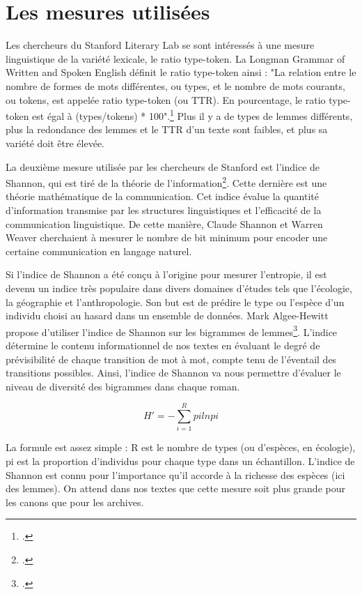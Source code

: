 \documentclass[a4paper,twoside,12pt]{book}
\begin{document}
\section{Les mesures utilisées}
 Les chercheurs du Stanford Literary Lab se sont intéressés à une mesure linguistique de la variété lexicale, le ratio type-token. La Longman Grammar of Written and Spoken English définit le ratio type-token ainsi : "La relation entre le nombre de formes de mots différentes, ou types, et le nombre de mots courants, ou tokens, est appelée ratio type-token (ou TTR). En pourcentage, le ratio type-token est égal à (types/tokens) * 100".\footcites{biber_longman_2011} Plus il y a de types de lemmes différents, plus la redondance des lemmes et le TTR d'un texte sont faibles, et plus sa variété doit être élevée.

La deuxième mesure utilisée par les chercheurs de Stanford est l'indice de Shannon, qui est tiré de la théorie de l'information\footcites{shannon_mathematical_1948}. Cette dernière est une théorie mathématique de la communication. Cet indice évalue la quantité d'information transmise par les structures linguistiques et l'efficacité de la communication linguistique. De cette manière, Claude Shannon et Warren Weaver cherchaient à mesurer le nombre de bit minimum pour encoder une certaine communication en langage naturel. 

Si l'indice de Shannon a été conçu à l'origine pour mesurer l'entropie, il est devenu un indice très populaire dans divers domaines d'études tels que l'écologie, la géographie et l'anthropologie. Son but est de prédire le type ou l'espèce d'un individu choisi au hasard dans un ensemble de données. Mark Algee-Hewitt propose d'utiliser l'indice de Shannon sur les bigrammes de lemmes\footcites{algee-hewitt_discourse_nodate}. L'indice détermine le contenu informationnel de nos textes en évaluant le degré de prévisibilité de chaque transition de mot à mot, compte tenu de l'éventail des transitions possibles. Ainsi, l'indice de Shannon va nous permettre d'évaluer le niveau de diversité des bigrammes dans chaque roman.

\begin{equation}
H\ensuremath{\prime}=-\sum_{i=1}^R pi ln pi
\end{equation}

La formule est assez simple : R est le nombre de types (ou d'espèces, en écologie), pi est la proportion d'individus pour chaque type dans un échantillon. L'indice de Shannon est connu pour l'importance qu'il accorde à la richesse des espèces (ici des lemmes). On attend dans nos textes que cette mesure soit plus grande pour les canons que pour les archives.
\end{document}
